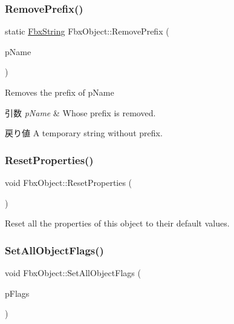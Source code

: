 \subsubsection{\texorpdfstring{Remove\+Prefix()}{RemovePrefix()}}
{\footnotesize\ttfamily static \hyperlink{class_fbx_string}{Fbx\+String} Fbx\+Object\+::\+Remove\+Prefix (\begin{DoxyParamCaption}\item[{char $\ast$}]{p\+Name }\end{DoxyParamCaption})\hspace{0.3cm}{\ttfamily [static]}}

Removes the prefix of p\+Name 
\begin{DoxyParams}{引数}
{\em p\+Name} & Whose prefix is removed. \\
\hline
\end{DoxyParams}
\begin{DoxyReturn}{戻り値}
A temporary string without prefix. 
\end{DoxyReturn}
\mbox{\label{class_fbx_object_af8626c123cf302297bdecb4c8d62db99}} 
\subsubsection{\texorpdfstring{Reset\+Properties()}{ResetProperties()}}
{\footnotesize\ttfamily void Fbx\+Object\+::\+Reset\+Properties (\begin{DoxyParamCaption}{ }\end{DoxyParamCaption})}

Reset all the properties of this object to their default values. \mbox{\label{class_fbx_object_aa59f051b6c0be5f93eb88cc2f15b43e5}} 
\subsubsection{\texorpdfstring{Set\+All\+Object\+Flags()}{SetAllObjectFlags()}}
{\footnotesize\ttfamily void Fbx\+Object\+::\+Set\+All\+Object\+Flags (\begin{DoxyParamCaption}\item[{\hyperlink{fbxtypes_8h_ae9fb141d8158a730aa85ec5ff2ea3f6b}{Fbx\+U\+Int}}]{p\+Flags }\end{DoxyParamCaption})}

